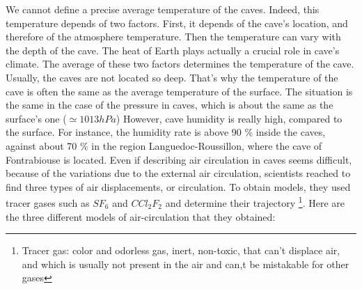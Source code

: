 \documentclass[draft, final]{report}
\begin{document}
\clearpage

We cannot define a precise average temperature of the caves. Indeed, this temperature depends of two factors. First, it depends of the cave’s location, and therefore of the atmosphere temperature. Then the temperature can vary with the depth of the cave. The heat of Earth plays actually a crucial role in cave’s climate. The average of these two factors determines the temperature of the cave. Usually, the caves are not located so deep. That’s why the temperature of the cave is often the same as the average temperature of the surface. The situation is the same in the case of the pressure in caves, which is about the same as the surface's one ($\simeq 1013 hPa$)
\smallbreak
However, cave humidity is really high, compared to the surface. For instance, the humidity rate is above 90 \% inside the caves, against about 70 \% in the region Languedoc-Roussillon, where the cave of Fontrabiouse is located.
\bigbreak
Even if describing air circulation in caves seems difficult, because of the variations due to the external air circulation, scientists reached to find three types of air displacements, or circulation. To obtain models, they used tracer gases such as $SF_{6}$ and $CCl_{2}F_{2}$ and determine their trajectory \footnote{Tracer gas: color and odorless gas, inert, non-toxic, that can’t displace air, and which is usually not present in the air and can,t be mistakable for other gases}. Here are the three different models of air-circulation that they obtained:
\end{document}
